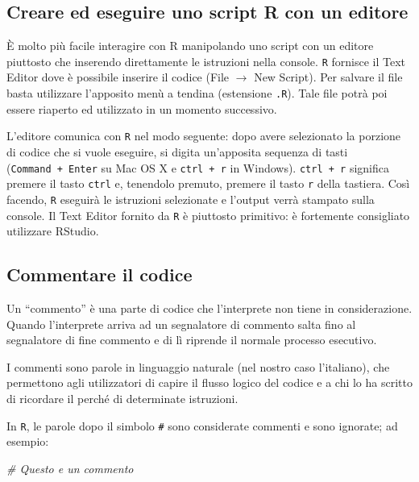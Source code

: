 \documentclass[
]{memoir}
\newenvironment{Shaded}{\begin{snugshade}}{\end{snugshade}}
\newcommand{\CommentTok}[1]{\textcolor[rgb]{0.56,0.35,0.01}{\textit{#1}}}
\theoremstyle{definition}
\theoremstyle{definition}
\theoremstyle{definition}
\theoremstyle{definition}
\theoremstyle{remark}
\begin{document}
\hypertarget{creare-ed-eseguire-uno-script-r-con-un-editore}{%
\subsection{Creare ed eseguire uno script R con un editore}\label{creare-ed-eseguire-uno-script-r-con-un-editore}}

È molto più facile interagire con R manipolando uno script con un
editore piuttosto che inserendo direttamente le istruzioni nella
console. \texttt{R} fornisce il Text Editor dove è possibile inserire il codice
(File \(\to\) New Script). Per salvare il file basta utilizzare l'apposito
menù a tendina (estensione \texttt{.R}). Tale file potrà poi essere riaperto ed
utilizzato in un momento successivo.

L'editore comunica con \texttt{R} nel modo seguente: dopo avere selezionato la
porzione di codice che si vuole eseguire, si digita un'apposita sequenza
di tasti (\texttt{Command\ +\ Enter} su Mac OS X e \texttt{ctrl\ +\ r} in Windows).
\texttt{ctrl\ +\ r} significa premere il tasto \texttt{ctrl} e, tenendolo premuto, premere il tasto \texttt{r} della tastiera.
Così facendo, \texttt{R} eseguirà le istruzioni selezionate e l'output verrà
stampato sulla console. Il Text Editor fornito da \texttt{R} è piuttosto
primitivo: è fortemente consigliato utilizzare RStudio.

\hypertarget{commentare-il-codice}{%
\subsection{Commentare il codice}\label{commentare-il-codice}}

Un ``commento'' è una parte di codice che l'interprete non tiene in considerazione. Quando l'interprete arriva ad un segnalatore di commento salta fino al segnalatore di fine commento e di lì riprende il normale processo esecutivo.

I commenti sono parole in linguaggio naturale (nel nostro caso l'italiano), che permettono agli utilizzatori di capire il flusso logico del codice e a chi lo ha scritto di ricordare il perché di determinate istruzioni.

In \texttt{R}, le parole dopo il simbolo \texttt{\#} sono considerate commenti e sono ignorate; ad esempio:

\begin{Shaded}
\begin{Highlighting}[]
\CommentTok{\# Questo e\textquotesingle{} un commento}
\end{Highlighting}
\end{Shaded}
\end{document}
